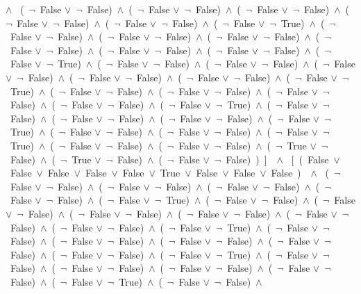 ﻿\documentclass[a4paper,10pt]{article}
\begin{document}
$\wedge$ \ (\  $\neg$\ False $\vee$\  $\neg$\ False)\ $\wedge$\ (\  $\neg$\ False $\vee$\  $\neg$\ False)\ $\wedge$\ (\  $\neg$\ False $\vee$\  $\neg$\ False)\ $\wedge$\ (\  $\neg$\ False $\vee$\  $\neg$\ False)\ $\wedge$\ (\  $\neg$\ False $\vee$\  $\neg$\ False)\ $\wedge$\ (\  $\neg$\ False $\vee$\  $\neg$\ True)\ $\wedge$\ (\  $\neg$\ False $\vee$\  $\neg$\ False)\ $\wedge$\ (\  $\neg$\ False $\vee$\  $\neg$\ False)\ $\wedge$\ (\  $\neg$\ False $\vee$\  $\neg$\ False)\ $\wedge$\ (\  $\neg$\ False $\vee$\  $\neg$\ False)\ $\wedge$\ (\  $\neg$\ False $\vee$\  $\neg$\ False)\ $\wedge$\ (\  $\neg$\ False $\vee$\  $\neg$\ False)\ $\wedge$\ (\  $\neg$\ False $\vee$\  $\neg$\ True)\ $\wedge$\ (\  $\neg$\ False $\vee$\  $\neg$\ False)\ $\wedge$\ (\  $\neg$\ False $\vee$\  $\neg$\ False)\ $\wedge$\ (\  $\neg$\ False $\vee$\  $\neg$\ False)\ $\wedge$\ (\  $\neg$\ False $\vee$\  $\neg$\ False)\ $\wedge$\ (\  $\neg$\ False $\vee$\  $\neg$\ False)\ $\wedge$\ (\  $\neg$\ False $\vee$\  $\neg$\ True)\ $\wedge$\ (\  $\neg$\ False $\vee$\  $\neg$\ False)\ $\wedge$\ (\  $\neg$\ False $\vee$\  $\neg$\ False)\ $\wedge$\ (\  $\neg$\ False $\vee$\  $\neg$\ False)\ $\wedge$\ (\  $\neg$\ False $\vee$\  $\neg$\ False)\ $\wedge$\ (\  $\neg$\ False $\vee$\  $\neg$\ True)\ $\wedge$\ (\  $\neg$\ False $\vee$\  $\neg$\ False)\ $\wedge$\ (\  $\neg$\ False $\vee$\  $\neg$\ False)\ $\wedge$\ (\  $\neg$\ False $\vee$\  $\neg$\ False)\ $\wedge$\ (\  $\neg$\ False $\vee$\  $\neg$\ True)\ $\wedge$\ (\  $\neg$\ False $\vee$\  $\neg$\ False)\ $\wedge$\ (\  $\neg$\ False $\vee$\  $\neg$\ False)\ $\wedge$\ (\  $\neg$\ False $\vee$\  $\neg$\ True)\ $\wedge$\ (\  $\neg$\ False $\vee$\  $\neg$\ False)\ $\wedge$\ (\  $\neg$\ False $\vee$\  $\neg$\ False)\ $\wedge$\ (\  $\neg$\ True $\vee$\  $\neg$\ False)\ $\wedge$\ (\  $\neg$\ True $\vee$\  $\neg$\ False)\ $\wedge$\ (\  $\neg$\ False $\vee$\  $\neg$\ False)\ )\ ]\ \ $\wedge$ \ [\ (\ False\ $\vee$\ False\ $\vee$\ False\ $\vee$\ False\ $\vee$\ False\ $\vee$\ True\ $\vee$\ False\ $\vee$\ False\ $\vee$\ False\ )\ \ $\wedge$ \ (\  $\neg$\ False $\vee$\  $\neg$\ False)\ $\wedge$\ (\  $\neg$\ False $\vee$\  $\neg$\ False)\ $\wedge$\ (\  $\neg$\ False $\vee$\  $\neg$\ False)\ $\wedge$\ (\  $\neg$\ False $\vee$\  $\neg$\ False)\ $\wedge$\ (\  $\neg$\ False $\vee$\  $\neg$\ True)\ $\wedge$\ (\  $\neg$\ False $\vee$\  $\neg$\ False)\ $\wedge$\ (\  $\neg$\ False $\vee$\  $\neg$\ False)\ $\wedge$\ (\  $\neg$\ False $\vee$\  $\neg$\ False)\ $\wedge$\ (\  $\neg$\ False $\vee$\  $\neg$\ False)\ $\wedge$\ (\  $\neg$\ False $\vee$\  $\neg$\ False)\ $\wedge$\ (\  $\neg$\ False $\vee$\  $\neg$\ False)\ $\wedge$\ (\  $\neg$\ False $\vee$\  $\neg$\ True)\ $\wedge$\ (\  $\neg$\ False $\vee$\  $\neg$\ False)\ $\wedge$\ (\  $\neg$\ False $\vee$\  $\neg$\ False)\ $\wedge$\ (\  $\neg$\ False $\vee$\  $\neg$\ False)\ $\wedge$\ (\  $\neg$\ False $\vee$\  $\neg$\ False)\ $\wedge$\ (\  $\neg$\ False $\vee$\  $\neg$\ False)\ $\wedge$\ (\  $\neg$\ False $\vee$\  $\neg$\ True)\ $\wedge$\ (\  $\neg$\ False $\vee$\  $\neg$\ False)\ $\wedge$\ (\  $\neg$\ False $\vee$\  $\neg$\ False)\ $\wedge$\ (\  $\neg$\ False $\vee$\  $\neg$\ False)\ $\wedge$\ (\  $\neg$\ False $\vee$\  $\neg$\ False)\ $\wedge$\ (\  $\neg$\ False $\vee$\  $\neg$\ True)\ $\wedge$\ (\  $\neg$\ False $\vee$\  $\neg$\ False)\ $\wedge$\ 
\end{document}

